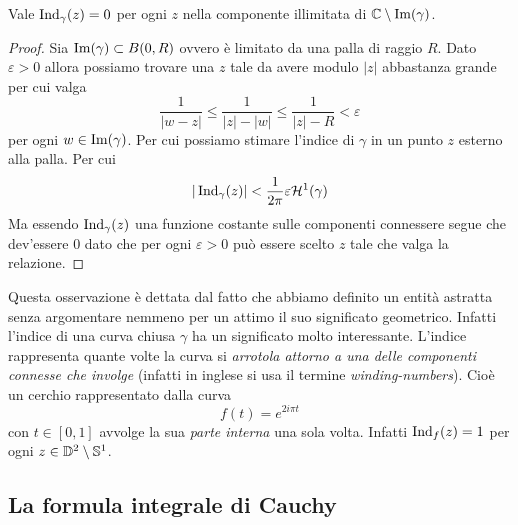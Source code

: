 \begin{corollary}
  Vale $\operatorname{Ind}_\gamma(z) = 0$ per ogni $z$ nella componente
  illimitata di $\mathbb{C} \setminus \operatorname{Im}(\gamma)$.  
  \label{cor:index-is-trivial-in-illimited-connex-component}
\end{corollary}
\begin{proof}
  Sia $\operatorname{Im}(\gamma) \subset B(0, R)$ ovvero è limitato da una palla di
  raggio $R$. Dato $\varepsilon > 0$ allora possiamo trovare una $z$ tale da
  avere modulo $|z|$ abbastanza grande per cui valga
  \begin{equation*}
    \frac{1}{|w-z|} \le \frac{1}{|z| - |w|} \le \frac{1}{|z| - R}
    < \varepsilon
  \end{equation*}
  per ogni $w \in \operatorname{Im}(\gamma)$. Per cui possiamo stimare l'indice di
  $\gamma$ in un punto $z$ esterno alla palla. Per cui
  \begin{equation*}
    |\operatorname{Ind}_\gamma(z)| < \frac{1}{2\pi} \varepsilon
    \mathcal{H}^1(\gamma)
  \end{equation*}
  Ma essendo $\operatorname{Ind}_\gamma(z)$ una funzione costante sulle
  componenti connessere segue che dev'essere $0$ dato che per ogni
  $\varepsilon > 0$ può essere scelto $z$ tale che valga la relazione.
\end{proof}

\begin{remark}
    Questa osservazione è dettata dal fatto che abbiamo definito un entità
    astratta senza argomentare nemmeno per un attimo il suo significato
    geometrico. Infatti l'indice di una curva chiusa $\gamma$ ha un significato
    molto interessante. L'indice rappresenta quante volte la curva si
    \textit{arrotola attorno a una delle componenti connesse che involge} (infatti
    in inglese si usa il termine \textit{winding-numbers}). Cioè un
    cerchio rappresentato dalla curva 
    \begin{equation*}
        f(t) = e^{2i\pi t}
    \end{equation*}
    con $t \in \left[0, 1 \right]$ avvolge la sua \textit{parte interna} una sola
    volta. Infatti $\operatorname{Ind}_f(z) = 1$ per ogni $z \in \mathbb{D}^2 
    \setminus \mathbb{S}^1$.
    \label{rmk:winding-numbers-interpretation}
\end{remark}


\subsection{\textcolor{AnComp}{\textbf{La formula integrale di Cauchy}}}


